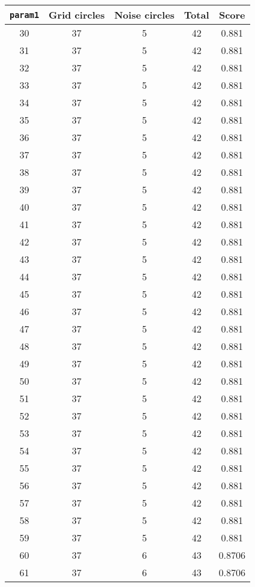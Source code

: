 \documentclass[letterpaper, 12pt]{article}
\begin{document}
\begin{longtable}{|c|c|c|c|c|}
\hline
\textbf{\texttt{param1}} & \textbf{Grid circles} & \textbf{Noise circles} & \textbf{Total} & \textbf{Score} \\
\hline
30 & 37 & 5 & 42 & 0.881 \\
\hline
31 & 37 & 5 & 42 & 0.881 \\
\hline
32 & 37 & 5 & 42 & 0.881 \\
\hline
33 & 37 & 5 & 42 & 0.881 \\
\hline
34 & 37 & 5 & 42 & 0.881 \\
\hline
35 & 37 & 5 & 42 & 0.881 \\
\hline
36 & 37 & 5 & 42 & 0.881 \\
\hline
37 & 37 & 5 & 42 & 0.881 \\
\hline
38 & 37 & 5 & 42 & 0.881 \\
\hline
39 & 37 & 5 & 42 & 0.881 \\
\hline
40 & 37 & 5 & 42 & 0.881 \\
\hline
41 & 37 & 5 & 42 & 0.881 \\
\hline
42 & 37 & 5 & 42 & 0.881 \\
\hline
43 & 37 & 5 & 42 & 0.881 \\
\hline
44 & 37 & 5 & 42 & 0.881 \\
\hline
45 & 37 & 5 & 42 & 0.881 \\
\hline
46 & 37 & 5 & 42 & 0.881 \\
\hline
47 & 37 & 5 & 42 & 0.881 \\
\hline
48 & 37 & 5 & 42 & 0.881 \\
\hline
49 & 37 & 5 & 42 & 0.881 \\
\hline
50 & 37 & 5 & 42 & 0.881 \\
\hline
51 & 37 & 5 & 42 & 0.881 \\
\hline
52 & 37 & 5 & 42 & 0.881 \\
\hline
53 & 37 & 5 & 42 & 0.881 \\
\hline
54 & 37 & 5 & 42 & 0.881 \\
\hline
55 & 37 & 5 & 42 & 0.881 \\
\hline
56 & 37 & 5 & 42 & 0.881 \\
\hline
57 & 37 & 5 & 42 & 0.881 \\
\hline
58 & 37 & 5 & 42 & 0.881 \\
\hline
59 & 37 & 5 & 42 & 0.881 \\
\hline
60 & 37 & 6 & 43 & 0.8706 \\
\hline
61 & 37 & 6 & 43 & 0.8706 \\

\end{longtable}
\end{document}
